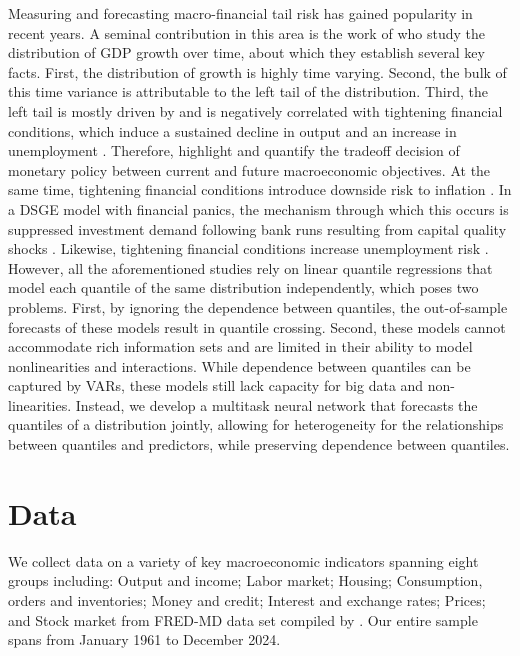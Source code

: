 \documentclass[12pt]{article}
\begin{document}
Measuring and forecasting macro-financial tail risk has gained popularity in recent years. A seminal contribution in this area is the work of \cite{adrianVulnerableGrowth2019} who study the distribution of GDP growth over time, about which they establish several key facts. First, the distribution of growth is highly time varying. Second, the bulk of this time variance is attributable to the left tail of the distribution. Third, the left tail is mostly driven by and is negatively correlated with tightening financial conditions, which induce a sustained decline in output and an increase in unemployment \citep{caldaraMonetaryPolicyReal2019}. Therefore, \cite{adrianVulnerableGrowth2019} highlight and quantify the tradeoff decision of monetary policy between current and future macroeconomic objectives. At the same time, tightening financial conditions introduce downside risk to inflation \citep{lopez-salidoInflationRisk2024}. In a DSGE model with financial panics, the mechanism through which this occurs is suppressed investment demand following bank runs resulting from capital quality shocks \cite{gertlerMacroeconomicModelFinancial2020}. Likewise, tightening financial conditions increase unemployment risk \citep{kileyUnemploymentRisk2022}. However, all the aforementioned studies rely on linear quantile regressions that model each quantile of the same distribution independently, which poses two problems. First, by ignoring the dependence between quantiles, the out-of-sample forecasts of these models result in quantile crossing. Second, these models cannot accommodate rich information sets and are limited in their ability to model nonlinearities and interactions. While dependence between quantiles can be captured by VARs, these models still lack capacity for big data and non-linearities. Instead, we develop a multitask neural network that forecasts the quantiles of a distribution jointly, allowing for heterogeneity for the relationships between quantiles and predictors, while preserving dependence between quantiles. 



\section{Data}

We collect data on a variety of key macroeconomic indicators spanning eight groups including: Output and income; Labor market; Housing; Consumption, orders and inventories; Money and credit; Interest and exchange rates; Prices; and Stock market from FRED-MD data set compiled by \cite{mccrackenFREDMDMonthlyDatabase2016}. Our entire sample spans from January 1961 to December 2024.
\end{document}
